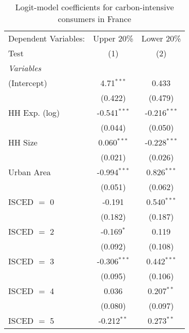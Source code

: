 
\begin{table}[htbp!]
   \centering
   \small
   \begin{adjustbox}{width = 1\textwidth, max height = 0.95\textheight, center}
      \begin{threeparttable}[b]
         \caption{\label{tab:Logit_1_FRA} Logit-model coefficients for carbon-intensive consumers in France}
         \begin{tabular}{lcc}
            \tabularnewline \midrule \midrule
            Dependent Variables: & Upper 20\%     & Lower 20\%\\   
            Test                 & (1)            & (2)\\  
            \midrule
            \emph{Variables}\\
            (Intercept)          & 4.71$^{***}$   & 0.433\\   
                                 & (0.422)        & (0.479)\\   
            HH Exp. (log)        & -0.541$^{***}$ & -0.216$^{***}$\\   
                                 & (0.044)        & (0.050)\\   
            HH Size              & 0.060$^{***}$  & -0.228$^{***}$\\   
                                 & (0.021)        & (0.026)\\   
            Urban Area           & -0.994$^{***}$ & 0.826$^{***}$\\   
                                 & (0.051)        & (0.062)\\   
            ISCED $=$ 0          & -0.191         & 0.540$^{***}$\\   
                                 & (0.182)        & (0.187)\\   
            ISCED $=$ 2          & -0.169$^{*}$   & 0.119\\   
                                 & (0.092)        & (0.108)\\   
            ISCED $=$ 3          & -0.306$^{***}$ & 0.442$^{***}$\\   
                                 & (0.095)        & (0.106)\\   
            ISCED $=$ 4          & 0.036          & 0.207$^{**}$\\   
                                 & (0.080)        & (0.097)\\   
            ISCED $=$ 5          & -0.212$^{**}$  & 0.273$^{**}$\\   

\end{tabular}
\end{threeparttable}
\end{adjustbox}
\end{table}
